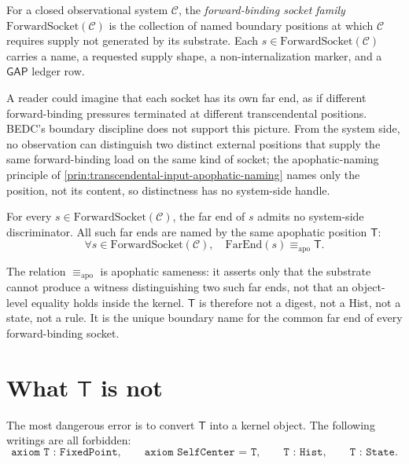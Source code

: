 \begin{definition}
\label{def:apophatic-fixed-point-socket-family}
For a closed observational system $\mathcal{C}$, the \emph{forward-binding socket family} $\mathrm{ForwardSocket}(\mathcal{C})$ is the collection of named boundary positions at which $\mathcal{C}$ requires supply not generated by its substrate. Each $s \in \mathrm{ForwardSocket}(\mathcal{C})$ carries a name, a requested supply shape, a non-internalization marker, and a $\mathsf{GAP}$ ledger row.
\end{definition}

A reader could imagine that each socket has its own far end, as if different forward-binding pressures terminated at different transcendental positions. BEDC's boundary discipline does not support this picture. From the system side, no observation can distinguish two distinct external positions that supply the same forward-binding load on the same kind of socket; the apophatic-naming principle of \autoref{prin:transcendental-input-apophatic-naming} names only the position, not its content, so distinctness has no system-side handle.

\begin{principle}
\label{prin:apophatic-fixed-point-unique-far-end}
For every $s \in \mathrm{ForwardSocket}(\mathcal{C})$, the far end of $s$ admits no system-side discriminator. All such far ends are named by the same apophatic position $\mathsf{T}$:
$$
\forall s \in \mathrm{ForwardSocket}(\mathcal{C}),\quad \mathrm{FarEnd}(s) \equiv_{\mathrm{apo}} \mathsf{T}.
$$
\end{principle}

The relation $\equiv_{\mathrm{apo}}$ is apophatic sameness: it asserts only that the substrate cannot produce a witness distinguishing two such far ends, not that an object-level equality holds inside the kernel. $\mathsf{T}$ is therefore not a digest, not a Hist, not a state, not a rule. It is the unique boundary name for the common far end of every forward-binding socket.

\section{What \texorpdfstring{$\mathsf{T}$}{T} is not}
\label{sec:apophatic-fixed-point-what-T-is-not}

The most dangerous error is to convert $\mathsf{T}$ into a kernel object. The following writings are all forbidden:
$$
\texttt{axiom T : FixedPoint}, \qquad \texttt{axiom SelfCenter = T}, \qquad \texttt{T : Hist}, \qquad \texttt{T : State}.
$$

